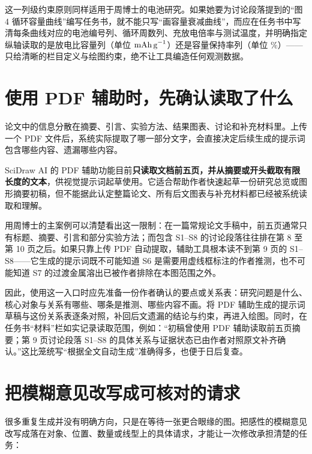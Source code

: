 这一列级约束原则同样适用于周博士的电池研究。如果她要为讨论段落提到的“图 4 循环容量曲线”编写任务书，就不能只写“画容量衰减曲线”，而应在任务书中写清每条曲线对应的电池编号列、循环周数列、充放电倍率与测试温度，并明确指定纵轴读取的是放电比容量列（单位 $\text{mAh\,g}^{-1}$）还是容量保持率列（单位 $\%$）——只给清晰的栏目定义与绘图约束，绝不让工具编造任何观测数据。

\section{使用 PDF 辅助时，先确认读取了什么}

论文中的信息分散在摘要、引言、实验方法、结果图表、讨论和补充材料里。上传一个 PDF 文件后，系统实际提取了哪一部分文字，会直接决定后续生成的提示词包含哪些内容、遗漏哪些内容。

SciDraw AI 的 PDF 辅助功能目前\textbf{只读取文档前五页，并从摘要或开头截取有限长度的文本}，供视觉提示词起草使用。它适合帮助作者快速起草一份研究总览或图形摘要初稿，但不能据此认定整篇论文、所有后文图表与补充材料都已经被系统读取和理解。

用周博士的主案例可以清楚看出这一限制：在一篇常规论文手稿中，前五页通常只有标题、摘要、引言和部分实验方法；而包含 S1–S8 的讨论段落往往排在第 8 至第 10 页之后。如果只靠上传 PDF 自动提取，辅助工具根本读不到第 9 页的 S1–S8——它生成的提示词既不可能知道 S6 是需要用虚线框标注的作者推测，也不可能知道 S7 的过渡金属溶出已被作者排除在本图范围之外。

因此，使用这一入口时应先准备一份作者确认的要点或关系表：研究问题是什么、核心对象与关系有哪些、哪条是推测、哪些内容不画。将 PDF 辅助生成的提示词草稿与这份关系表逐条对照，补回后文遗漏的结论与约束，再进入绘图。同时，在任务书“材料”栏如实记录读取范围，例如：“初稿曾使用 PDF 辅助读取前五页摘要；第 9 页讨论段落 S1–S8 的具体关系与证据状态已由作者对照原文补齐确认。”这比笼统写“根据全文自动生成”准确得多，也便于日后复查。

\section{把模糊意见改写成可核对的请求}

很多重复生成并没有明确方向，只是在等待一张更合眼缘的图。把感性的模糊意见改写成落在对象、位置、数量或线型上的具体请求，才能让一次修改承担清楚的任务：

